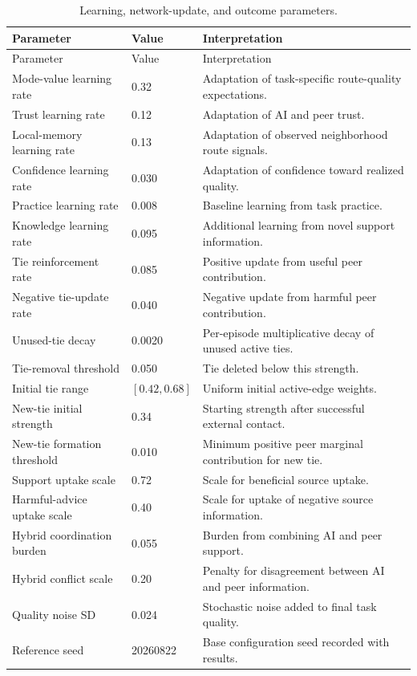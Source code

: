 \documentclass[11pt]{article}
\begin{document}
\begin{longtable}{p{}p{}p{}}
\caption{Learning, network-update, and outcome parameters.}\label{tab:param_update}\\
\toprule Parameter & Value & Interpretation \\
\midrule\endfirsthead\toprule Parameter & Value & Interpretation \\
\midrule\endhead
Mode-value learning rate & 0.32 & Adaptation of task-specific route-quality expectations. \\
Trust learning rate & 0.12 & Adaptation of AI and peer trust. \\
Local-memory learning rate & 0.13 & Adaptation of observed neighborhood route signals. \\
Confidence learning rate & 0.030 & Adaptation of confidence toward realized quality. \\
Practice learning rate & 0.008 & Baseline learning from task practice. \\
Knowledge learning rate & 0.095 & Additional learning from novel support information. \\
Tie reinforcement rate & 0.085 & Positive update from useful peer contribution. \\
Negative tie-update rate & 0.040 & Negative update from harmful peer contribution. \\
Unused-tie decay & 0.0020 & Per-episode multiplicative decay of unused active ties. \\
Tie-removal threshold & 0.050 & Tie deleted below this strength. \\
Initial tie range & $[0.42,0.68]$ & Uniform initial active-edge weights. \\
New-tie initial strength & 0.34 & Starting strength after successful external contact. \\
New-tie formation threshold & 0.010 & Minimum positive peer marginal contribution for new tie. \\
Support uptake scale & 0.72 & Scale for beneficial source uptake. \\
Harmful-advice uptake scale & 0.40 & Scale for uptake of negative source information. \\
Hybrid coordination burden & 0.055 & Burden from combining AI and peer support. \\
Hybrid conflict scale & 0.20 & Penalty for disagreement between AI and peer information. \\
Quality noise SD & 0.024 & Stochastic noise added to final task quality. \\
Reference seed & 20260822 & Base configuration seed recorded with results. \\
\bottomrule
\end{longtable}
\end{document}
